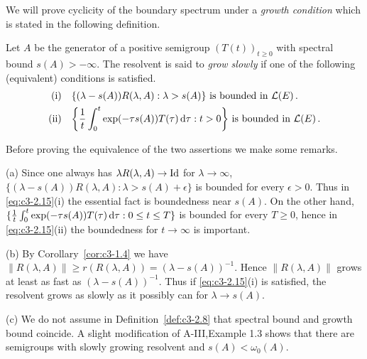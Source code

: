 We will prove cyclicity of the boundary spectrum under a \emph{growth condition} which is stated in the following definition.
%
%
\begin{definition}\label{def:c3-2.8}
	Let $A$ be the generator of a positive semigroup $(T(t))_{t \geq 0}$ with spectral bound $s(A) > -\infty$.
	The resolvent is said to \emph{grow slowly} if one of the following (equivalent) conditions is satisfied.
	\begin{equation}\label{eq:c3-2.15}
	\begin{aligned}
	\text{(i)}\quad & \text{$\{(\lambda-s(A))R(\lambda,A) : \lambda > s(A)\}$ is bounded in $\mathcal{L}(E)$}\,.\\
	\text{(ii)}\quad & \text{$\left\{\frac{1}{t} \int_{0}^{t} \exp(-\tau s(A))T(\tau) \mathop{}\!\mathrm{d}{\tau} : t > 0\right\}$ is bounded in $\mathcal{L}(E)$}\,.
	\end{aligned}
	\end{equation}
\end{definition}
Before proving the equivalence of the two assertions we make some remarks.

(a) Since one always has $\lambda R(\lambda,A) \to \operatorname{Id}$ for $\lambda \to \infty$, $\{(\lambda-s(A))R(\lambda,A) : \lambda > s(A)+\epsilon\}$ is bounded for every $\epsilon > 0$.
Thus in \eqref{eq:c3-2.15}(i) the essential fact is boundedness near $s(A)$.
On the other hand, $\{\frac{1}{t} \int_{0}^{t} \exp(-\tau s(A))T(\tau) \mathop{}\!\mathrm{d}{\tau} : 0 \leq t \leq T\}$ is bounded for every $T \geq 0$, hence in \eqref{eq:c3-2.15}(ii) the boundedness for $t \to \infty$ is important.

(b) By Corollary~\ref{cor:c3-1.4} we have $\|R(\lambda,A)\| \geq r(R(\lambda,A)) = (\lambda-s(A))^{-1}$.
Hence $\|R(\lambda,A)\|$ grows at least as fast as $(\lambda-s(A))^{-1}$.
Thus if \eqref{eq:c3-2.15}(i) is satisfied, the resolvent grows as slowly as it possibly can for $\lambda \to s(A)$.

(c) We do not assume in Definition~\ref{def:c3-2.8} that spectral bound and growth bound coincide.
A slight modification of A-III,Example 1.3 shows that there are semigroups with slowly growing resolvent and $s(A) < \omega_0(A)$.

